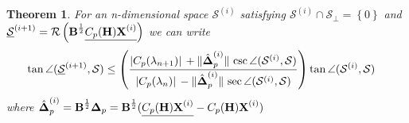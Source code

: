 \documentclass[preprint,3p,number,sort&compress]{elsarticle}
\newtheorem{theorem}{Theorem}[section]
\newcommand{\bB}{\textbf{B}}
\newcommand{\bH}{\textbf{H}}
\newcommand{\bX}{\textbf{X}}
\newcommand{\bDelta}{\boldsymbol{\Delta}}
\newcommand{\apx}[1]{\underline {#1}}
\DeclarePairedDelimiter\norm{\lVert}{\rVert\,}%
\DeclarePairedDelimiter\abs{\lvert}{\rvert\,}%
\begin{document}
\begin{theorem}
\label{thm:apprxConv}
 For an n-dimensional space $\mathcal{S}^{(i)}$ satisfying $\mathcal{S}^{(i)}\cap\mathcal{S}_\perp=\left\{0\right\}$ and $\normalfont\underline{\mathcal{S}}^{(i+1)}=\mathcal{R}\left(\bB^{\frac{1}{2}}\apx{C_p(\bH)\bX^{(i)}}\right)$ we can write
 \begin{align}
   \tan{\angle(\underline{\mathcal{S}}^{(i+1)},\mathcal{S})}&\leq\left(\frac{\abs{C_p(\lambda_{n+1})}+\norm{\hat{\bDelta}_p^{(i)}}\csc{\angle(\mathcal{S}^{(i)},\mathcal{S})}}{\abs{C_p(\lambda_n)}-\norm{\hat{\bDelta}_p^{(i)}}\sec{\angle(\mathcal{S}^{(i)},\mathcal{S})}}\right)\tan{\angle(\mathcal{S}^{(i)},\mathcal{S})}\label{eqn:convIneqApp}
 \end{align}
 where $\normalfont\hat{\bDelta}_p^{(i)}=\bB^{\frac{1}{2}}\bDelta_p=\bB^{\frac{1}{2}}(\apx{C_p(\bH)\bX^{(i)}}-C_p(\bH)\bX^{(i)})$ 
\end{theorem}
\end{document}
